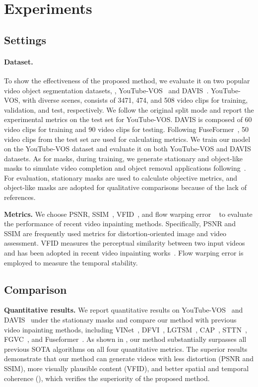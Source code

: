 \documentclass[final]{cvpr}
\newcommand{\subtitle}[1]{\noindent \textbf{#1}}
\begin{document}
\section{Experiments}
\subsection{Settings}
\paragraph{Dataset.}
To show the effectiveness of the proposed method, we evaluate it on two popular video object segmentation datasets, \ie, YouTube-VOS~\cite{xu2018youtube} and DAVIS~\cite{perazzi2016benchmark}.
YouTube-VOS, with diverse scenes, consists of 3471, 474, and 508 video clips for training, validation, and test, respectively. 
We follow the original split mode and report the experimental metrics on the test set for YouTube-VOS.
DAVIS is composed of 60 video clips for training and 90 video clips for testing.
Following FuseFormer~\cite{Liu_2021_FuseFormer}, 50 video clips from the test set are used for calculating metrics.
We train our model on the YouTube-VOS dataset and evaluate it on both YouTube-VOS and DAVIS datasets.
As for masks, during training, we generate stationary and object-like masks to simulate video completion and object removal applications following~\cite{kim2019deep,chang2019learnable,lee2019cpnet,yan2020sttn,Liu_2021_FuseFormer}.
For evaluation, stationary masks are used to calculate objective metrics, and object-like masks are adopted for qualitative comparisons because of the lack of references.

\subtitle{Metrics.}
We choose PSNR, SSIM~\cite{wang2004image}, VFID~\cite{NEURIPS2018_d86ea612}, and flow warping error ~\cite{Lai-ECCV-2018} to evaluate the performance of recent video inpainting methods.
Specifically, PSNR and SSIM are frequently used metrics for distortion-oriented image and video assessment.
VFID measures the perceptual similarity between two input videos and has been adopted in recent video inpainting works~\cite{yan2020sttn,Liu_2021_FuseFormer}. 
Flow warping error  is employed to measure the temporal stability.

\subsection{Comparison}
\subtitle{Quantitative results.}
We report quantitative results on YouTube-VOS~\cite{xu2018youtube} and DAVIS~\cite{perazzi2016benchmark} under the stationary masks and compare our method with previous video inpainting methods, including VINet~\cite{kim2019deep}, DFVI~\cite{Xu_2019_CVPR}, LGTSM~\cite{chang2019learnable}, CAP~\cite{lee2019cpnet}, STTN~\cite{yan2020sttn}, FGVC~\cite{Gao-ECCV-FGVC}, and Fuseformer~\cite{Liu_2021_FuseFormer}.
As shown in , our method substantially surpasses all previous SOTA algorithms on all four quantitative metrics.
The superior results demonstrate that our method can generate videos with less distortion (PSNR and SSIM), more visually plausible content (VFID), and better spatial and temporal coherence (), which verifies the superiority of the proposed method.
\end{document}
